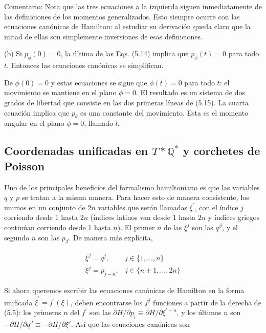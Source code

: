 \begin{example}
Comentario: Nota que las tres ecuaciones a la izquierda siguen inmediatamente de las definiciones de los momentos generalizados. Esto siempre ocurre con las ecuaciones canónicas de Hamilton: al estudiar su derivación queda claro que la mitad de ellas son simplemente inversiones de esas definiciones.

(b) Si $p_{\phi}(0)=0$, la última de las Eqs. (5.14) implica que $p_{\phi}(t)=0$ para todo $t$. Entonces las ecuaciones canónicas se simplifican.

De $\phi(0)=0$ y estas ecuaciones se sigue que $\phi(t)=0$ para todo $t$: el movimiento se mantiene en el plano $\phi=0$. El resultado es un sistema de dos grados de libertad que consiste en las dos primeras líneas de (5.15). La cuarta ecuación implica que $p_{\theta}$ es una constante del movimiento. Esta es el momento angular en el plano $\phi=0$, llamado $l$.
  
\end{example}

\subsection{
Coordenadas unificadas en $T* \mathbb{Q}^{*}$ y corchetes de Poisson}

Uno de los principales beneficios del formalismo hamiltoniano es que las variables $q$ y $p$ se tratan a la misma manera. Para hacer esto de manera consistente, los unimos en un conjunto de $2 n$ variables que serán llamadas $\xi^{\prime}$, con el índice $j$ corriendo desde 1 hasta $2 n$ (índices latinos van desde 1 hasta $2 n$ y índices griegos continúan corriendo desde 1 hasta $n$). El primer $n$ de las $\xi^{j}$ son las $q^{\beta}$, y el segundo $n$ son las $p_{\beta}$. De manera más explícita,

$$
\begin{array}{ll}
\xi^{j}=q^{j}, & j \in\{1, \ldots, n\} \\
\xi^{j}=p_{j-n}, & j \in\{n+1, \ldots, 2 n\}
\end{array}
$$

Si ahora queremos escribir las ecuaciones canónicas de Hamilton en la forma unificada $\dot{\xi}^{\prime}=f^{\prime}(\xi)$, deben encontrarse los $f^{j}$ funciones a partir de la derecha de (5.5): los primeros $n$ del $f^{\prime}$ son las $\partial H / \partial p_{\jmath} \equiv \partial H / \partial \xi^{\prime+n}$, y los últimos $n$ son $-\partial H / \partial q^{J} \equiv-\partial H / \partial \xi^{j}$. Así que las ecuaciones canónicas son

